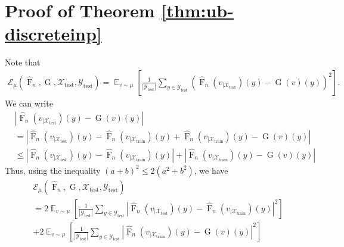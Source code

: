 \documentclass[11pt]{article}
\theoremstyle{plain}
\newcommand{\Xcal}{\mathcal{X}}
\newcommand{\Ycal}{\mathcal{Y}}
\newcommand{\Ecal}{\mathcal{E}}
\DeclareMathOperator*{\expect}{\mathbb{E}}
\begin{document}
\section{Proof of Theorem \ref{thm:ub-discreteinp}}
Note that
\begin{equation*}
    \begin{split}
           \Ecal_{\mu}(\widehat{\operatorname{F}}_n, \operatorname{G}, \Xcal_{\mathrm{test}}, \Ycal_{\mathrm{test}} )= \expect_{v \sim \mu} \left[ \frac{1}{|\Ycal_{\mathrm{test}}|} \sum_{y \in \Ycal_{\mathrm{test}}} \left( \widehat{\operatorname{F}}_n(v_{|\Xcal_{\mathrm{test}}})(y) - \operatorname{G}(v)(y) \right)^2 \right].
    \end{split}
\end{equation*}
We can write 
\begin{equation*}
    \begin{split}
       &|\widehat{\operatorname{F}}_n(v_{|\Xcal_{\mathrm{test}}})(y) - \operatorname{G}(v)(y)| \\
       &= |\widehat{\operatorname{F}}_n(v_{|\Xcal_{\mathrm{test}}})(y) - \widehat{\operatorname{F}}_n(v_{|\Xcal_{\mathrm{train}}})(y) +\widehat{\operatorname{F}}_n(v_{|\Xcal_{\mathrm{train}}})(y) -\operatorname{G}(v)(y)|\\
       &\leq |\widehat{\operatorname{F}}_n(v_{|\Xcal_{\mathrm{test}}})(y) - \widehat{\operatorname{F}}_n(v_{|\Xcal_{\mathrm{train}}})(y)| + |\widehat{\operatorname{F}}_n(v_{|\Xcal_{\mathrm{train}}})(y) -\operatorname{G}(v)(y)|
    \end{split}
\end{equation*}
Thus, using the inequality $(a+b)^2 \leq 2(a^2+b^2)$, we have
\begin{equation*}
    \begin{split}
         &\Ecal_{\mu}(\widehat{\operatorname{F}}_n, \operatorname{G}, \Xcal_{\mathrm{test}}, \Ycal_{\mathrm{test}} ) \\
         &= 2\expect_{v \sim \mu} \left[ \frac{1}{|\Ycal_{\mathrm{test}}|} \sum_{y \in \Ycal_{\mathrm{test}}} |\widehat{\operatorname{F}}_n(v_{|\Xcal_{\mathrm{test}}})(y) - \widehat{\operatorname{F}}_n(v_{|\Xcal_{\mathrm{train}}})(y)| ^2 \right] \\
         &+ 2\expect_{v \sim \mu} \left[ \frac{1}{|\Ycal_{\mathrm{test}}|} \sum_{y \in \Ycal_{\mathrm{test}}} |\widehat{\operatorname{F}}_n(v_{|\Xcal_{\mathrm{train}}})(y) -\operatorname{G}(v)(y)|^2 \right]
    \end{split}
\end{equation*}
\end{document}
